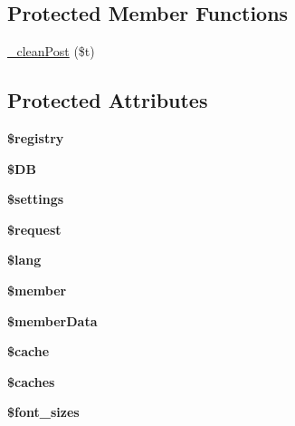 \subsection*{Protected Member Functions}
\begin{DoxyCompactItemize}
\item 
\hyperlink{classclass__editor_a94d849793fcdcbc49d1e6e607b3df870}{\-\_\-clean\-Post} (\$t)
\end{DoxyCompactItemize}
\subsection*{Protected Attributes}
\begin{DoxyCompactItemize}
\item 
\hypertarget{classclass__editor_a531e4a386aaa7f3e06d3642dc38d7e80}{{\bfseries \$registry}}\label{classclass__editor_a531e4a386aaa7f3e06d3642dc38d7e80}

\item 
\hypertarget{classclass__editor_a7dc56dc8b18ad37272b56fa7395bedef}{{\bfseries \$\-D\-B}}\label{classclass__editor_a7dc56dc8b18ad37272b56fa7395bedef}

\item 
\hypertarget{classclass__editor_ac7c3353107070daa85f641882931b358}{{\bfseries \$settings}}\label{classclass__editor_ac7c3353107070daa85f641882931b358}

\item 
\hypertarget{classclass__editor_abb35c8495a232b510389fa6d7b15d38a}{{\bfseries \$request}}\label{classclass__editor_abb35c8495a232b510389fa6d7b15d38a}

\item 
\hypertarget{classclass__editor_a7714b111b644017933931ec69a154102}{{\bfseries \$lang}}\label{classclass__editor_a7714b111b644017933931ec69a154102}

\item 
\hypertarget{classclass__editor_a5e1c849c6148a8732eee400fcee0d044}{{\bfseries \$member}}\label{classclass__editor_a5e1c849c6148a8732eee400fcee0d044}

\item 
\hypertarget{classclass__editor_ae9d848ba2cf6eee63bdc060e2dfcf95a}{{\bfseries \$member\-Data}}\label{classclass__editor_ae9d848ba2cf6eee63bdc060e2dfcf95a}

\item 
\hypertarget{classclass__editor_ac2dc76d756ec398393d4b1d23659276c}{{\bfseries \$cache}}\label{classclass__editor_ac2dc76d756ec398393d4b1d23659276c}

\item 
\hypertarget{classclass__editor_a0334a912b7c2d39a9bc71177578d782e}{{\bfseries \$caches}}\label{classclass__editor_a0334a912b7c2d39a9bc71177578d782e}

\item 
{\bfseries \$font\-\_\-sizes}
\end{DoxyCompactItemize}



